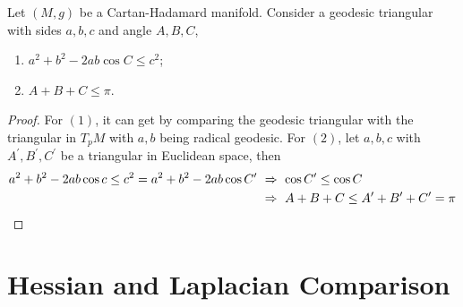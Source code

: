 \begin{enumerate}[label=\arabic{*}.]
	\begin{cor}
		Let $(M,g)$ be a Cartan-Hadamard manifold. Consider a geodesic triangular with sides $a,b,c$ and angle $A,B,C$,
		\begin{enumerate}[label=(\arabic{*})]
			\item $a^2+b^2-2ab\cos C \leq c^2$;
			\item $A + B + C \leq \pi$.
		\end{enumerate}
	\end{cor}
	\begin{proof}
		For $(1)$, it can get by comparing the geodesic triangular with the triangular in $T_pM$ with $a,b$ being radical geodesic. For $(2)$, let $a,b,c$ with $A^\prime,B^\prime,C^\prime$ be a triangular in Euclidean space, then
		\begin{equation*}
			\begin{aligned}
				a^2+b^2-2ab\cos c \leq c^2 = a^2+b^2-2ab\cos C^\prime &~ \Rightarrow ~ \cos C^\prime \leq \cos C \\
				&~ \Rightarrow ~ A + B + C \leq A^\prime + B^\prime + C^\prime = \pi \qedhere
			\end{aligned}
		\end{equation*}
	\end{proof}
\end{enumerate}


\section{Hessian and Laplacian Comparison}

